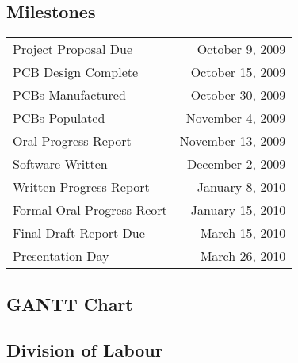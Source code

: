 \subsection{Milestones}

\begin{center}
  \begin{tabular}{|l|r|}
    \hline
    Project Proposal Due & October 9, 2009\\
    PCB Design Complete & October 15, 2009\\
    PCBs Manufactured & October 30, 2009\\
    PCBs Populated & November 4, 2009\\
    Oral Progress Report & November 13, 2009\\
    Software Written & December 2, 2009\\
    Written Progress Report & January 8, 2010\\
    Formal Oral Progress Reort & January 15, 2010\\
    Final Draft Report Due & March 15, 2010\\
    Presentation Day & March 26, 2010\\
    \hline
  \end{tabular}
\end{center}


\subsection{GANTT Chart}
\subsection{Division of Labour}
